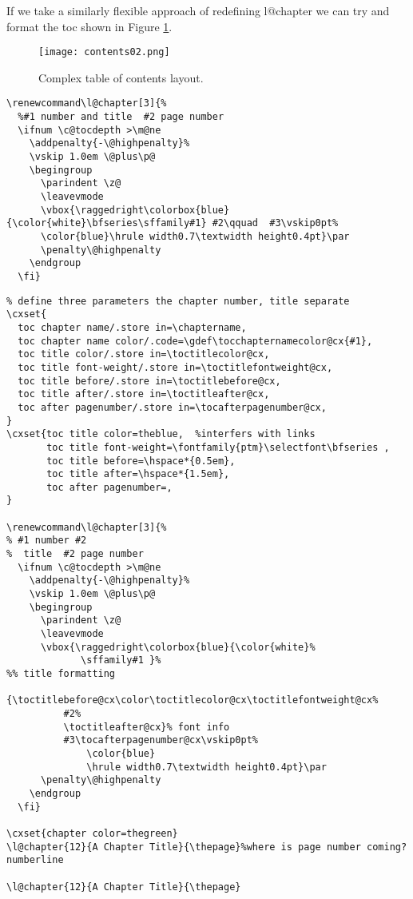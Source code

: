 If we take a similarly flexible approach of redefining l@chapter we can try and format the toc shown in Figure \ref{fig:tocsteward}.

\begin{figure}[tp]
\centering

\texttt{[image: contents02.png]}
\caption{Complex table of contents layout.}
\label{fig:tocsteward}
\end{figure}



\begin{lstlisting}
\renewcommand\l@chapter[3]{%
  %#1 number and title  #2 page number
  \ifnum \c@tocdepth >\m@ne
    \addpenalty{-\@highpenalty}%
    \vskip 1.0em \@plus\p@
    \begingroup
      \parindent \z@
      \leavevmode
      \vbox{\raggedright\colorbox{blue}{\color{white}\bfseries\sffamily#1} #2\qquad  #3\vskip0pt%
      \color{blue}\hrule width0.7\textwidth height0.4pt}\par
      \penalty\@highpenalty
    \endgroup
  \fi}
\end{lstlisting}

\begin{lstlisting}
% define three parameters the chapter number, title separate
\cxset{
  toc chapter name/.store in=\chaptername,
  toc chapter name color/.code=\gdef\tocchapternamecolor@cx{#1},
  toc title color/.store in=\toctitlecolor@cx,
  toc title font-weight/.store in=\toctitlefontweight@cx,
  toc title before/.store in=\toctitlebefore@cx,
  toc title after/.store in=\toctitleafter@cx,
  toc after pagenumber/.store in=\tocafterpagenumber@cx,
}
\cxset{toc title color=theblue,  %interfers with links
       toc title font-weight=\fontfamily{ptm}\selectfont\bfseries ,
       toc title before=\hspace*{0.5em},
       toc title after=\hspace*{1.5em},
       toc after pagenumber=,
}

\renewcommand\l@chapter[3]{%
% #1 number #2
%  title  #2 page number
  \ifnum \c@tocdepth >\m@ne
    \addpenalty{-\@highpenalty}%
    \vskip 1.0em \@plus\p@
    \begingroup
      \parindent \z@
      \leavevmode
      \vbox{\raggedright\colorbox{blue}{\color{white}%
             \sffamily#1 }%
%% title formatting
        {\toctitlebefore@cx\color\toctitlecolor@cx\toctitlefontweight@cx%
          #2%
          \toctitleafter@cx}% font info
          #3\tocafterpagenumber@cx\vskip0pt%
              \color{blue}
              \hrule width0.7\textwidth height0.4pt}\par
      \penalty\@highpenalty
    \endgroup
  \fi}

\cxset{chapter color=thegreen}
\l@chapter{12}{A Chapter Title}{\thepage}%where is page number coming?numberline

\l@chapter{12}{A Chapter Title}{\thepage}
\end{lstlisting}


